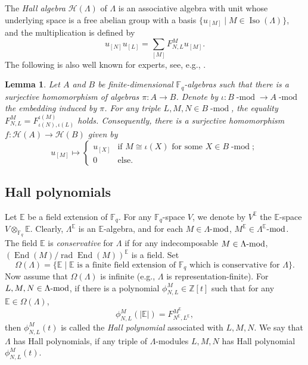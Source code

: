 \documentclass[12pt]{amsart}
\newtheorem{lemma}[theorem]{Lemma}
\theoremstyle{remark}
\theoremstyle{definition}
\numberwithin{equation}{section}
\newcommand{\rad}{\operatorname{rad}\nolimits}
\newcommand{\End}{\operatorname{End}\nolimits}
\newcommand{\opname}{\operatorname}
\begin{document}
The {\it Hall algebra} \cite{Ringel90banach} $\mathcal{H}(\Lambda)$ of $\Lambda$ is an associative algebra with unit whose underlying space is a free abelian group with a basis $\{u_{[M]}\mid M\in \opname{Iso}(\Lambda)\}$, and the multiplication is defined by
\[u_{[N]}u_{[L]}=\sum_{[M]}F_{N,L}^Mu_{[M]}.
\]
The following is also well known for experts, see, e.g., \cite[Lemma 5.2]{LW23}.
\begin{lemma}\label{lem:surjective-hall-algebra-homo}
    Let $A$ and $B$ be finite-dimensional $\mathbb{F}_q$-algebras such that there is a surjective homomorphism of algebras $\pi:A\to B$. Denote by $\iota: B\text{-$\opname{mod}$}\to A\text{-$\opname{mod}$}$ the embedding induced by $\pi$. For any triple $L,M,N\in B\text{-$\opname{mod}$}$, the equality $F_{N,L}^M=F_{\iota(N),\iota(L)}^{\iota(M)}$ holds. Consequently, there is a surjective homomorphism $f:\mathcal{H}(A)\to \mathcal{H}(B)$ given by \[u_{[M]}\mapsto\begin{cases}u_{[X]}&\text{if $M\cong \iota(X)$ for some $X\in B\text{-$\opname{mod}$}$};\\
    0&\text{else}.
    \end{cases}
    \]
\end{lemma}


\subsection{Hall polynomials}
Let $\mathbb{E}$ be a field extension of $\mathbb{F}_q$. For any $\mathbb{F}_q$-space $V$, we denote by $V^\mathbb{E}$ the $\mathbb{E}$-space $V\otimes_{\mathbb{F}_q}\mathbb{E}$.
Clearly, $\Lambda^\mathbb{E}$ is an $\mathbb{E}$-algebra, and for each $M\in\Lambda$-${\rm mod}$, $M^\mathbb{E}\in\Lambda^\mathbb{E}$-${\rm mod}$.  The field $\mathbb{E}$ is  {\it conservative} for $\Lambda$ if for any indecomposable $M\in \Lambda\text{-{\rm mod}}$, $(\End(M)/\rad \End(M))^\mathbb{E}$ is a field. Set
\[
\Omega(\Lambda)=\{\mathbb{E}\mid \text{$\mathbb{E}$ is a finite field extension of $\mathbb{F}_q$ which is conservative for $\Lambda$}\}.
\]
Now assume that $\Omega(\Lambda)$ is infinite  (e.g., $\Lambda$ is representation-finite). For $L,M,N\in\Lambda\text{-{\rm mod}}$, if there is a polynomial $\phi_{N,L}^M\in \mathbb{Z}[t]$ such that for any $\mathbb{E}\in \Omega(\Lambda)$, 
\[
\phi_{N,L}^M(|\mathbb{E}|)=F_{N^\mathbb{E},L^\mathbb{E}}^{M^\mathbb{E}},
\]
then $\phi_{N,L}^M(t)$ is called the {\it Hall polynomial}  associated with $L,M,N$. We say that $\Lambda$ has Hall polynomials, if any triple of $\Lambda$-modules $L,M,N$ has Hall polynomial $\phi_{N,L}^M(t)$.
\end{document}
